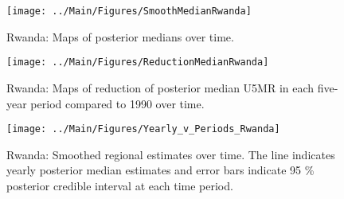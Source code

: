 \documentclass[12pt]{article}\usepackage[]{graphicx}\usepackage[]{color}
\newenvironment{knitrout}{}{} %
\begin{document}
\begin{knitrout}
\color{fgcolor}\begin{figure}[bht]

{\centering \texttt{[image: ../Main/Figures/SmoothMedianRwanda]} 

}

\caption[Rwanda]{Rwanda: Maps of posterior medians over time.}\label{fig:unnamed-chunk-274}
\end{figure}


\end{knitrout}
\begin{knitrout}
\color{fgcolor}\begin{figure}[bht]

{\centering \texttt{[image: ../Main/Figures/ReductionMedianRwanda]} 

}

\caption[Rwanda]{Rwanda: Maps of reduction of posterior median U5MR in each five-year period compared to 1990 over time.}\label{fig:unnamed-chunk-275}
\end{figure}


\end{knitrout}
\begin{knitrout}
\color{fgcolor}\begin{figure}[bht]

{\centering \texttt{[image: ../Main/Figures/Yearly\_v\_Periods\_Rwanda]} 

}

\caption[Rwanda]{Rwanda: Smoothed regional estimates over time. The line indicates yearly posterior median estimates and error bars indicate 95 \% posterior credible interval at each time period.}\label{fig:unnamed-chunk-276}
\end{figure}


\end{knitrout}
\end{document}
